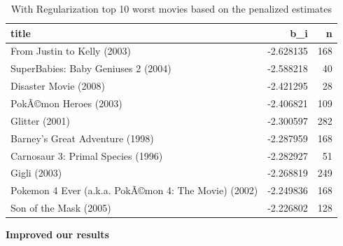 \documentclass[
]{article}
\newenvironment{Shaded}{}{}
\newcommand{\AttributeTok}[1]{\textcolor[rgb]{0.49,0.56,0.16}{#1}}
\newcommand{\DecValTok}[1]{\textcolor[rgb]{0.25,0.63,0.44}{#1}}
\newcommand{\FloatTok}[1]{\textcolor[rgb]{0.25,0.63,0.44}{#1}}
\newcommand{\FunctionTok}[1]{\textcolor[rgb]{0.02,0.16,0.49}{#1}}
\newcommand{\NormalTok}[1]{#1}
\newcommand{\OtherTok}[1]{\textcolor[rgb]{0.00,0.44,0.13}{#1}}
\newcommand{\SpecialCharTok}[1]{\textcolor[rgb]{0.25,0.44,0.63}{#1}}
\newcommand{\StringTok}[1]{\textcolor[rgb]{0.25,0.44,0.63}{#1}}
\begin{document}
\begin{table}[H]

\caption{\label{tab:e_u_pls_2}With Regularization top 10 worst movies based on the penalized estimates\label{tbl:with_regularization_top_10_worst_movies_based_on_the_penalized_estimates}}
\centering
\begin{tabular}[t]{lrr}
\toprule
title & b\_i & n\\
\midrule
From Justin to Kelly (2003) & -2.628135 & 168\\
SuperBabies: Baby Geniuses 2 (2004) & -2.588218 & 40\\
Disaster Movie (2008) & -2.421295 & 28\\
PokÃ©mon Heroes (2003) & -2.406821 & 109\\
Glitter (2001) & -2.300597 & 282\\
Barney's Great Adventure (1998) & -2.287959 & 168\\
Carnosaur 3: Primal Species (1996) & -2.282927 & 51\\
Gigli (2003) & -2.268819 & 249\\
Pokemon 4 Ever (a.k.a. PokÃ©mon 4: The Movie) (2002) & -2.249836 & 168\\
Son of the Mask (2005) & -2.226802 & 128\\
\bottomrule
\end{tabular}
\end{table}

\textbf{Improved our results}

\begin{Shaded}
\end{Shaded}
\end{document}
